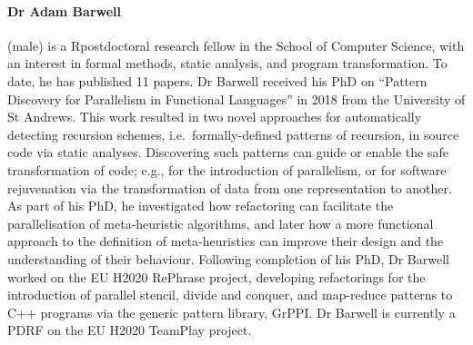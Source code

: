 \documentclass[a4paper,11pt]{article}
\begin{document}
\paragraph{Dr Adam Barwell} (male) is a Rpostdoctoral research fellow in the School of Computer Science, with an interest in formal methods, static analysis, and program transformation. To date, he has published 11 papers. Dr Barwell received his PhD on ``Pattern Discovery for Parallelism in Functional Languages'' in 2018 from the University of St Andrews. This work resulted in two novel approaches for automatically detecting recursion schemes, i.e.\ formally-defined patterns of recursion, in source code via static analyses. Discovering such patterns can guide or enable the safe transformation of code; e.g., for the introduction of parallelism, or for software rejuvenation via the transformation of data from one representation to another.
%
As part of his PhD, he investigated how refactoring can facilitate the parallelisation of meta-heuristic algorithms, and later how a more functional approach to the definition of meta-heuristics can improve their design and the understanding of their behaviour. 
%
Following completion of his PhD, Dr Barwell worked on the EU H2020 RePhrase project, developing refactorings for the introduction of parallel stencil, divide and conquer, and map-reduce patterns to C++ programs via the generic pattern library, GrPPI. 
%
Dr Barwell is currently a PDRF on the EU H2020 TeamPlay project. 
\end{document}
